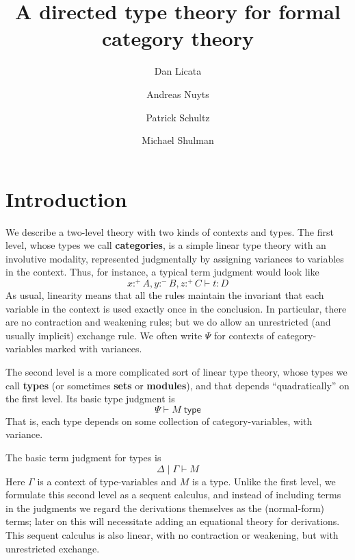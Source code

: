 \documentclass{amsart}
\title{A directed type theory for formal category theory}
\author{Dan Licata \and Andreas Nuyts \and Patrick Schultz \and Michael Shulman}
\let\types\vdash %
\def\cb{\mid} %
\def\p{^+} %
\def\m{^-}
\def\type{\;\mathsf{type}}
\begin{document}
\maketitle

\section{Introduction}
\label{sec:introduction}

We describe a two-level theory with two kinds of contexts and types.
The first level, whose types we call \textbf{categories}, is a simple linear type theory with an involutive modality, represented judgmentally by assigning variances to variables in the context.
Thus, for instance, a typical term judgment would look like
\[ x:\p A, y:\m B, z :\p C \types t:D \]
As usual, linearity means that all the rules maintain the invariant that each variable in the context is used exactly once in the conclusion.
In particular, there are no contraction and weakening rules; but we do allow an unrestricted (and usually implicit) exchange rule.
We often write $\Psi$ for contexts of category-variables marked with variances.

The second level is a more complicated sort of linear type theory, whose types we call \textbf{types} (or sometimes \textbf{sets} or \textbf{modules}), and that depends ``quadratically'' on the first level.
Its basic type judgment is
\[ \Psi \types M \type \]
That is, each type depends on some collection of category-variables, with variance.

The basic term judgment for types is
\[ \Delta \cb \Gamma \types M \]
Here $\Gamma$ is a context of type-variables and $M$ is a type.
Unlike the first level, we formulate this second level as a sequent calculus, and instead of including terms in the judgments we regard the derivations themselves as the (normal-form) terms; later on this will necessitate adding an equational theory for derivations.
This sequent calculus is also linear, with no contraction or weakening, but with unrestricted exchange.
\end{document}
